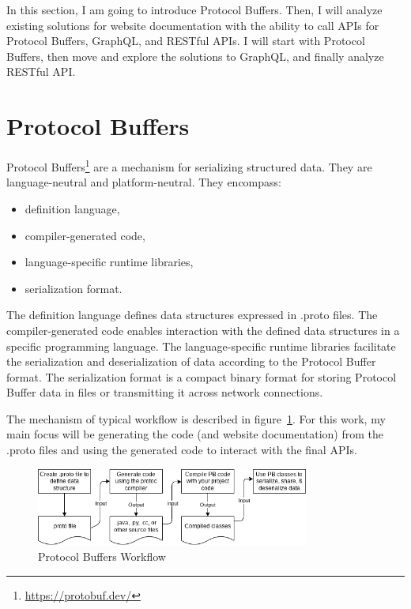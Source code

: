 In this section, I am going to introduce Protocol Buffers.
Then, I will analyze existing solutions for website documentation with the ability to call APIs for Protocol Buffers, GraphQL, and RESTful APIs.
I will start with Protocol Buffers, then move and explore the solutions to GraphQL, and finally analyze RESTful API\@.


\section{Protocol Buffers}
Protocol Buffers\footnote{\url{https://protobuf.dev/}} are a mechanism for serializing structured data.
They are language-neutral and platform-neutral.
They encompass:
\begin{itemize}
    \item definition language,
    \item compiler-generated code,
    \item language-specific runtime libraries,
    \item serialization format.
\end{itemize}
The definition language defines data structures expressed in .proto files.
The compiler-generated code enables interaction with the defined data structures in a specific programming language.
The language-specific runtime libraries facilitate the serialization and deserialization of data according to the Protocol Buffer format.
The serialization format is a compact binary format for storing Protocol Buffer data in files or transmitting it across network connections.
\cite{protobuf-overview}

The mechanism of typical workflow is described in figure~\ref{fig:protobuf-mechanism}.
For this work, my main focus will be generating the code (and website documentation) from the .proto files and using the generated code to interact with the final APIs.
\begin{figure}[hbt!]
    \centering
    \captionsetup{justification=centering}
    \includegraphics[width=0.8\textwidth]{images/protocol-buffers-concepts}
    \caption{Protocol Buffers Workflow~\cite{protobuf-overview}}
    \label{fig:protobuf-mechanism}
\end{figure}

